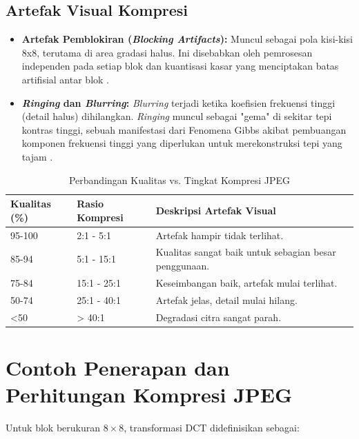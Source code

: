 \documentclass[a4paper]{article}
\begin{document}
\subsection{Artefak Visual Kompresi}
\begin{itemize}
  \item \textbf{Artefak Pemblokiran (\textit{Blocking Artifacts}):} Muncul sebagai pola kisi-kisi 8x8, terutama di area gradasi halus. Ini disebabkan oleh pemrosesan independen pada setiap blok dan kuantisasi kasar yang menciptakan batas artifisial antar blok \cite{singh2012blocking, chou1998smoothing}.
  \item \textbf{\textit{Ringing} dan \textit{Blurring}:} \textit{Blurring} terjadi ketika koefisien frekuensi tinggi (detail halus) dihilangkan. \textit{Ringing} muncul sebagai "gema" di sekitar tepi kontras tinggi, sebuah manifestasi dari Fenomena Gibbs akibat pembuangan komponen frekuensi tinggi yang diperlukan untuk merekonstruksi tepi yang tajam \cite{gottlieb1996gibbs, marziliano2004perceptual}.
\end{itemize}

\begin{table}[h!]
  \centering
  \caption{Perbandingan Kualitas vs. Tingkat Kompresi JPEG}
  \label{tab:kualitas_jpeg}
  \begin{tabular*}{\columnwidth}{@{\extracolsep{\fill}}lll@{}}
    \toprule
    \textbf{Kualitas (\%)} & \textbf{Rasio Kompresi} & \textbf{Deskripsi Artefak Visual}                     \\ \midrule
    95-100                 & 2:1 - 5:1               & Artefak hampir tidak terlihat.                        \\
    85-94                  & 5:1 - 15:1              & Kualitas sangat baik untuk sebagian besar penggunaan. \\
    75-84                  & 15:1 - 25:1             & Keseimbangan baik, artefak mulai terlihat.            \\
    50-74                  & 25:1 - 40:1             & Artefak jelas, detail mulai hilang.                   \\
    <50                    & > 40:1                  & Degradasi citra sangat parah.                         \\ \bottomrule
  \end{tabular*}
\end{table}

\section{Contoh Penerapan dan Perhitungan Kompresi JPEG}
Untuk blok berukuran $8\times8$, transformasi DCT didefinisikan sebagai:
\end{document}

